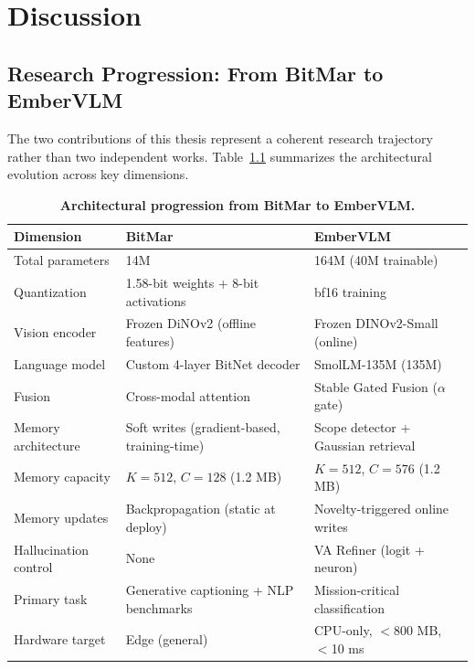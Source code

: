 \chapter{Discussion}
\label{cha:discussion}

\section{Research Progression: From BitMar to EmberVLM}
\label{sec:disc_progression}

The two contributions of this thesis represent a coherent research trajectory rather than two independent works. Table~\ref{tab:progression_comparison} summarizes the architectural evolution across key dimensions.

\begin{table}[htbp]
\centering
\caption{\textbf{Architectural progression from BitMar to EmberVLM.}}
\label{tab:progression_comparison}
\begin{tabularx}{\textwidth}{lXX}
\toprule
\textbf{Dimension} & \textbf{BitMar} & \textbf{EmberVLM} \\
\midrule
Total parameters & 14M & 164M (40M trainable) \\
Quantization & 1.58-bit weights + 8-bit activations & bf16 training \\
Vision encoder & Frozen DiNOv2 (offline features) & Frozen DINOv2-Small (online) \\
Language model & Custom 4-layer BitNet decoder & SmolLM-135M (135M) \\
Fusion & Cross-modal attention & Stable Gated Fusion ($\alpha$ gate) \\
Memory architecture & Soft writes (gradient-based, training-time) & Scope detector + Gaussian retrieval \\
Memory capacity & $K{=}512$, $C{=}128$ (1.2 MB) & $K{=}512$, $C{=}576$ (1.2 MB) \\
Memory updates & Backpropagation (static at deploy) & Novelty-triggered online writes \\
Hallucination control & None & VA Refiner (logit + neuron) \\
Primary task & Generative captioning + NLP benchmarks & Mission-critical classification \\
Hardware target & Edge (general) & CPU-only, $<$800 MB, $<$10 ms \\
\bottomrule
\end{tabularx}
\end{table}

